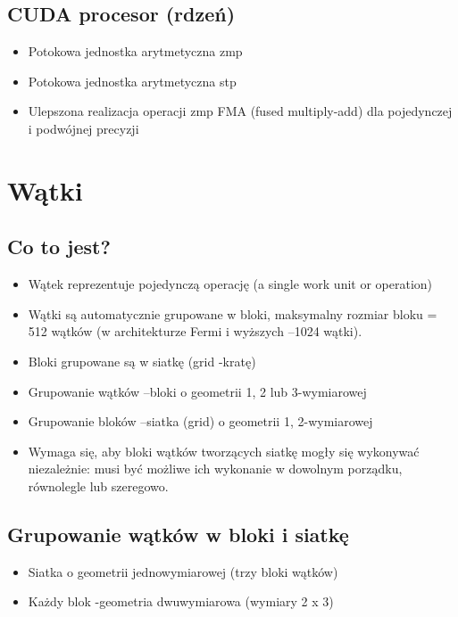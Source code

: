 	\subsection{CUDA procesor (rdzeń)}
		\begin{itemize}
			\item Potokowa jednostka arytmetyczna zmp
			\item Potokowa jednostka arytmetyczna stp
			\item Ulepszona realizacja operacji zmp FMA (fused multiply-add) dla pojedynczej i podwójnej precyzji
		\end{itemize}

	\newpage
	\section{Wątki}
		\subsection{Co to jest?}
			\begin{itemize}
				\item Wątek reprezentuje pojedynczą operację (a single work unit or operation)
				\item Wątki są automatycznie grupowane w bloki, maksymalny rozmiar bloku = 512 wątków (w architekturze Fermi i wyższych –1024 wątki).
				\item Bloki grupowane są w siatkę (grid -kratę)
				\item Grupowanie wątków –bloki o geometrii 1, 2 lub 3-wymiarowej
				\item Grupowanie bloków –siatka (grid) o geometrii 1, 2-wymiarowej
				\item Wymaga się, aby bloki wątków tworzących siatkę mogły się wykonywać niezależnie: musi być możliwe ich wykonanie w dowolnym porządku, równolegle lub szeregowo.
			\end{itemize}
		\subsection{Grupowanie wątków w bloki i siatkę}
			\begin{itemize}
				\item Siatka o geometrii jednowymiarowej (trzy bloki wątków)
				\item Każdy blok -geometria dwuwymiarowa (wymiary 2 x 3)
			\end{itemize}
